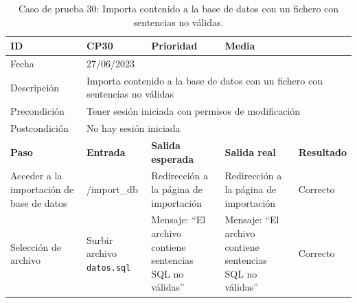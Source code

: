 \begin{table}[H]
\begin{tabular}{p{} p{} p{} p{} p{}}
\cellcolor{gray!25}
ID   & CP30 & \cellcolor{gray!25} Prioridad   & Media \\ \hline
\cellcolor{gray!25} Fecha	&	\multicolumn{4}{l}{27/06/2023} \\ \hline
\cellcolor{gray!25} Descripción		&	\multicolumn{4}{p{.66\textwidth}}{Importa contenido a la base de datos con un fichero con sentencias no válidas} \\ \hline                                            
\cellcolor{gray!25}
Precondición  & \multicolumn{4}{p{.66\textwidth}}{Tener sesión iniciada con permisos de modificación} \\ \hline
\cellcolor{gray!25} Postcondición & \multicolumn{4}{l}{No hay sesión iniciada}                                                    \\ \hline
\rowcolor{gray!25}
\textbf{Paso}   & \textbf{Entrada} & \textbf{Salida esperada} & \textbf{Salida real} & \textbf{Resultado} \\ \hline
Acceder a la importación de base de datos
& /import\_db                                                                          
& Redirección a la página de importación                              
& Redirección a la página de importación                               
& Correcto                            
\\ \hline
Selección de archivo
& Surbir archivo \texttt{datos.sql}                                                                       
& Mensaje: ``El archivo contiene sentencias SQL no válidas''                             
& Mensaje: ``El archivo contiene sentencias SQL no válidas''                                
& Correcto                            
\\ \hline
\end{tabular}
\caption{Caso de prueba 30: Importa contenido a la base de datos con un fichero con sentencias no válidas.}
\end{table}

